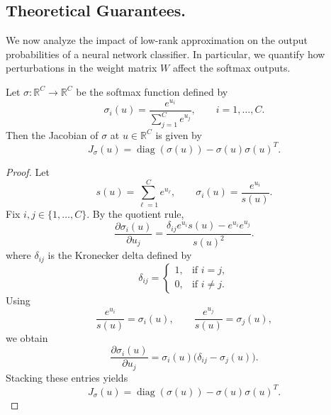 \documentclass[twoside,leqno,onecolumn]{article}
\begin{document}
\subsection{Theoretical Guarantees.}
We now analyze the impact of low-rank approximation on the output probabilities of a neural network classifier. In particular, we quantify how perturbations in the weight matrix $W$ affect the softmax outputs.

\begin{lemma}
Let $\sigma:\mathbb{R}^C \to \mathbb{R}^C$ be the softmax function defined by
\begin{equation}
\sigma_i(u)=\frac{e^{u_i}}{\sum_{j=1}^C e^{u_j}},
\qquad i=1,\dots,C.
\end{equation}
Then the Jacobian of $\sigma$ at $u\in\mathbb{R}^C$ is given by
\begin{equation}
J_\sigma(u)=\operatorname{diag}(\sigma(u))-\sigma(u)\sigma(u)^T.\label{eq:jacob}
\end{equation}
\end{lemma}

\begin{proof}
Let
\[
s(u)=\sum_{\ell=1}^C e^{u_\ell},
\qquad
\sigma_i(u)=\frac{e^{u_i}}{s(u)}.
\]
Fix $i,j\in\{1,\dots,C\}$. By the quotient rule,
\[
\frac{\partial \sigma_i(u)}{\partial u_j}
=
\frac{\delta_{ij} e^{u_i}s(u)-e^{u_i}e^{u_j}}{s(u)^2}.
\]
where $\delta_{ij}$ is the Kronecker delta defined by
\[
\delta_{ij} =
\begin{cases}
1, & \text{if } i=j,\\
0, & \text{if } i\neq j.
\end{cases}
\]
Using
\[
\frac{e^{u_i}}{s(u)}=\sigma_i(u),
\qquad
\frac{e^{u_j}}{s(u)}=\sigma_j(u),
\]
we obtain
\[
\frac{\partial \sigma_i(u)}{\partial u_j}
=
\sigma_i(u)\bigl(\delta_{ij}-\sigma_j(u)\bigr).
\]
Stacking these entries yields
\[
J_\sigma(u)=\operatorname{diag}(\sigma(u))-\sigma(u)\sigma(u)^T.
\]
\end{proof}
\end{document}
